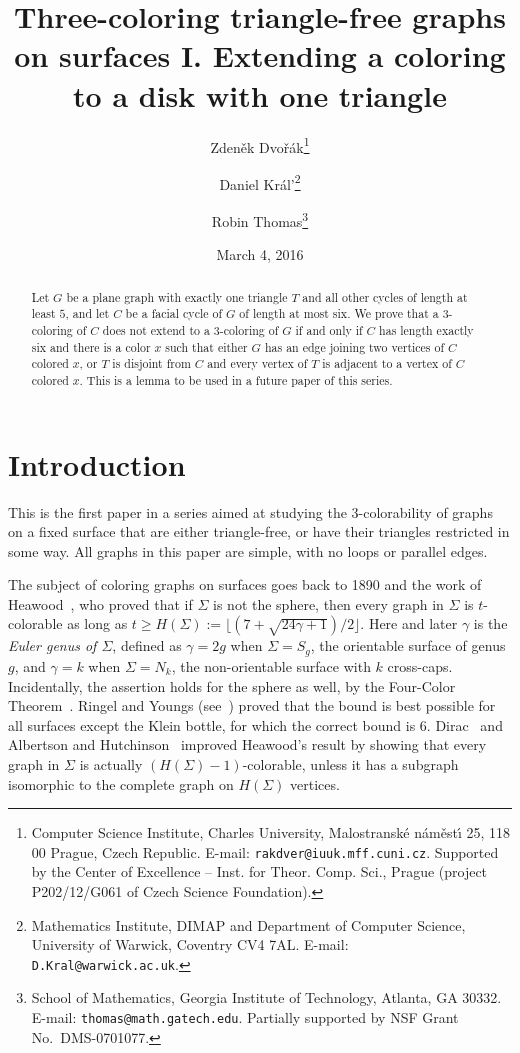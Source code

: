 \documentclass{article}
\begin{document}
\title{Three-coloring triangle-free graphs on surfaces I. 
       Extending a coloring to a disk with one triangle}
\author{Zden\v{e}k Dvo\v{r}\'ak\thanks{Computer Science Institute,
           Charles University, 
           Malostransk{\'e} n{\'a}m{\v e}st{\'\i} 25, 118 00 Prague, 
           Czech Republic. E-mail: {\tt rakdver@iuuk.mff.cuni.cz}.
           Supported by the Center of Excellence -- Inst. for Theor. Comp. Sci., Prague (project P202/12/G061 of Czech Science Foundation).}
 \and
     Daniel Kr{\'a}l'\thanks{Mathematics Institute, DIMAP and Department of Computer Science, University of Warwick, Coventry CV4 7AL. E-mail: {\tt D.Kral@warwick.ac.uk}.}
 \and
        Robin Thomas\thanks{School of Mathematics, 
        Georgia Institute of Technology, Atlanta, GA 30332. 
        E-mail: {\tt thomas@math.gatech.edu}.
        Partially supported by NSF Grant No.~DMS-0701077.}
}
\date{March 4, 2016}
\maketitle
\begin{abstract}
Let $G$ be a plane graph with exactly one triangle $T$ and all 
other cycles of length at least $5$, and let $C$ be a facial cycle of $G$
of length at most six.
We prove that a $3$-coloring of $C$ does not extend to a $3$-coloring of $G$ 
if and only if $C$ has length exactly six and there is a color $x$ such that
either $G$ has an edge joining two vertices of $C$ colored $x$,
or $T$ is disjoint from $C$ and every vertex of $T$ is adjacent to a vertex
of $C$ colored $x$.
This is a lemma to be used in a future paper of this series.
\end{abstract}

\section{Introduction}


This is the first paper in a series aimed at studying the $3$-colorability
of graphs on a fixed surface that are either triangle-free, or have their
triangles restricted in some way.
All graphs in this paper are simple, with no loops or parallel edges.

The subject of coloring graphs on surfaces goes back to 1890 and the work
of Heawood~\cite{Heawood}, who proved that if $\Sigma$ is not the
sphere, then every graph in $\Sigma$
is $t$-colorable as long as
$t\ge H(\Sigma):=\lfloor(7+\sqrt{24\gamma+1})/2\rfloor$.
Here and later $\gamma$ is the {\em Euler genus of $\Sigma$},
defined as $\gamma=2g$ when $\Sigma=S_g$, the orientable surface
of genus $g$, and $\gamma=k$ when $\Sigma=N_k$, the non-orientable surface
with $k$ cross-caps.
Incidentally, the assertion holds for the sphere as well, by the
Four-Color Theorem~\cite{AppHak1,AppHakKoc,AppHak89,RobSanSeyTho4CT}.
Ringel and Youngs (see~\cite{Ringel}) proved that the bound is
best possible for all surfaces except the Klein bottle, for which
the correct bound is $6$.
Dirac~\cite{Dirmap} and Albertson and Hutchinson~\cite{AlbHut}
improved Heawood's result by showing that
every graph in $\Sigma$ is actually $(H(\Sigma)-1)$-colorable,
unless it has a subgraph isomorphic to the complete graph
on $H(\Sigma)$ vertices.
\end{document}
